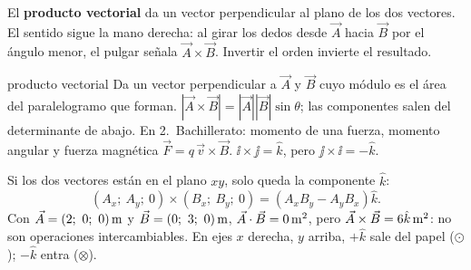 \documentclass[11pt,a4paper]{article}
\begin{document}
El \textbf{producto vectorial} da un vector perpendicular al plano de los dos
vectores. El sentido sigue la mano derecha: al girar los dedos desde $\vec A$ hacia
$\vec B$ por el \'angulo menor, el pulgar se\~nala $\vec A\times\vec B$.
Invertir el orden invierte el resultado.

\begin{toolbox}{producto vectorial}
 Da un vector perpendicular a $\vec A$ y $\vec B$ cuyo m\'odulo
es el \'area del paralelogramo que forman.
 $|\vec A\times\vec B|=|\vec A||\vec B|\sin\theta$;
las componentes salen del determinante de abajo.
 En 2.\textordmasculine\ Bachillerato: momento de una fuerza,
momento angular y fuerza magn\'etica $\vec F=q\,\vec v\times\vec B$.
 $\ii\times\jj=\hat k$, pero $\jj\times\ii=-\hat k$.
\end{toolbox}

Si los dos vectores est\'an en el plano $xy$, solo queda la componente $\hat k$:
\[
(A_x;\ A_y;\ 0)\times(B_x;\ B_y;\ 0)=(A_xB_y-A_yB_x)\hat k.
\]
Con $\vec A=(2;\ 0;\ 0)\,\mathrm{m}$ y $\vec B=(0;\ 3;\ 0)\,\mathrm{m}$,
$\vec A\cdot\vec B=0\,\mathrm{m^2}$, pero
$\vec A\times\vec B=6\hat k\,\mathrm{m^2}$: no son operaciones intercambiables.
En ejes $x$ derecha, $y$ arriba, $+\hat k$ sale del papel ($\odot$);
$-\hat k$ entra ($\otimes$).
\end{document}
